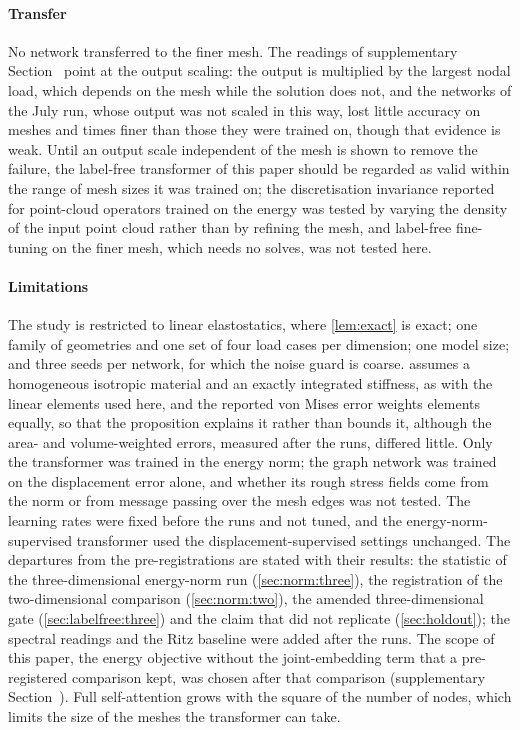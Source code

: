\paragraph{Transfer}
No network transferred to the finer mesh. The readings of supplementary
Section~\SuppTransfer{} point at the output scaling: the output is multiplied by the largest
nodal load, which depends on the mesh while the solution does not, and the networks of the
July run, whose output was not scaled in this way, lost little accuracy on meshes
\numCoarsenLow{} and \numCoarsenHigh{} times finer than those they were trained on, though
that evidence is weak. Until an output scale independent of the mesh is shown to remove the
failure, the label-free transformer of this paper should be regarded as valid within the
range of mesh sizes it was trained on; the discretisation invariance reported for point-cloud
operators trained on the energy \cite{Wang2026PretrainFEM,Sun2026FEVessel} was tested by
varying the density of the input point cloud rather than by refining the mesh, and
label-free fine-tuning on the finer mesh, which needs no solves, was not tested here.

\paragraph{Limitations}
The study is restricted to linear elastostatics, where \cref{lem:exact} is exact; one family
of geometries and one set of four load cases per dimension; one model size; and three seeds
per network, for which the noise guard is coarse.  assumes a homogeneous
isotropic material and an exactly integrated stiffness, as with the linear elements used
here, and the reported von Mises error weights elements equally, so that the proposition
explains it rather than bounds it, although the area- and volume-weighted errors, measured
after the runs, differed little. Only the transformer was trained in the energy norm; the
graph network was trained on the displacement error alone, and whether its rough stress
fields come from the norm or from message passing over the mesh edges was not tested. The
learning rates were fixed before the runs and not tuned, and the energy-norm-supervised
transformer used the displacement-supervised settings unchanged. The departures from the
pre-registrations are stated with their results: the statistic of the three-dimensional
energy-norm run (\cref{sec:norm:three}), the registration of the two-dimensional comparison
(\cref{sec:norm:two}), the amended three-dimensional gate (\cref{sec:labelfree:three}) and
the claim that did not replicate (\cref{sec:holdout}); the spectral readings and the Ritz
baseline were added after the runs. The scope of this paper, the energy objective without
the joint-embedding term that a pre-registered comparison kept, was chosen after that
comparison (supplementary Section~\SuppPrereg{}). Full self-attention grows with the square of
the number of nodes, which limits the size of the meshes the transformer can take.

